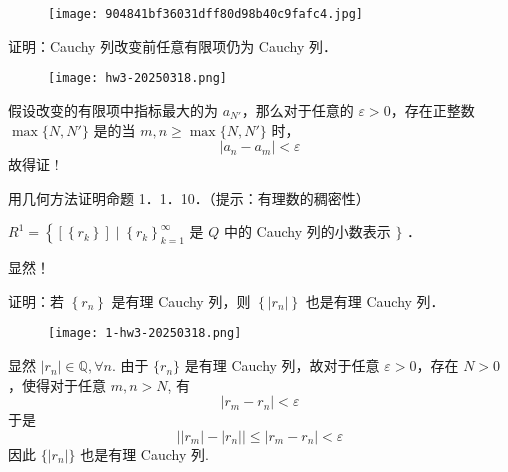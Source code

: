 \begin{figure}[H]
\centering
\texttt{[image: 904841bf36031dff80d98b40c9fafc4.jpg]}
\label{}
\end{figure}

\begin{exercise}
证明：Cauchy 列改变前任意有限项仍为 Cauchy 列．
\end{exercise}
\begin{figure}[H]
\centering
\texttt{[image: hw3-20250318.png]}
\label{}
\end{figure}

假设改变的有限项中指标最大的为 $a_{N'}$，那么对于任意的 $\varepsilon>0$，存在正整数 $\max\{ N,N' \}$ 是的当 $m,n\geq \max\{ N,N' \}$ 时，
\[
\lvert a_n-a_m \rvert <\varepsilon
\]
故得证 !

\begin{exercise}
用几何方法证明命题 1．1．10．（提示：有理数的稠密性）
\end{exercise}
\begin{proposition}
$R^1=\left\{\left[\left\{r_k\right\}\right] \mid\left\{r_k\right\}_{k=1}^{\infty}\right.$ 是 $Q$ 中的 Cauchy 列的小数表示 $\}$ ．
\end{proposition}
显然！

\begin{exercise}
证明：若 $\left\{r_n\right\}$ 是有理 Cauchy 列，则 $\left\{\left|r_n\right|\right\}$ 也是有理 Cauchy 列．
\end{exercise}
\begin{figure}[H]
\centering
\texttt{[image: 1-hw3-20250318.png]}
\label{}
\end{figure}

显然 $\lvert r_n \rvert\in \mathbb{Q},\forall n$. 由于 $\{ r_n \}$ 是有理 Cauchy 列，故对于任意 $\varepsilon>0$，存在 $N>0$，使得对于任意 $m,n>N$, 有
\[
\lvert r_m-r_n \rvert <\varepsilon
\]
于是
\[
\lvert \lvert r_m \rvert -\lvert r_n \rvert   \rvert \leq \lvert r_m-r_n \rvert<\varepsilon
\]
因此 $\{ \lvert r_n \rvert \}$ 也是有理 Cauchy 列.

